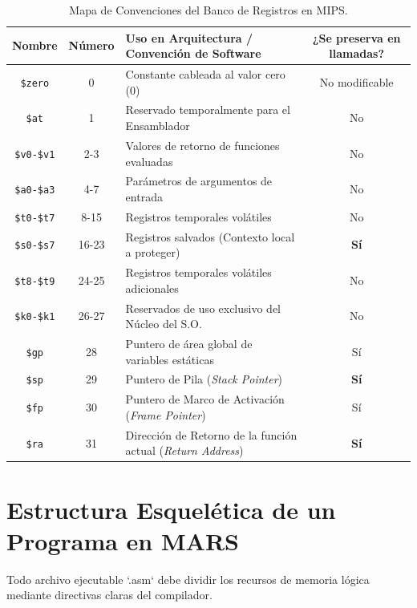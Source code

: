 \documentclass[11pt,letterpaper]{article}
\begin{document}
\begin{table}[h!]
\centering
\small
\begin{tabular}{cclc}
\toprule
\textbf{Nombre} & \textbf{Número} & \textbf{Uso en Arquitectura / Convención de Software} & \textbf{¿Se preserva en llamadas?} \\
\midrule
\texttt{\$zero} & 0 & Constante cableada al valor cero (0) & No modificable \\
\texttt{\$at}   & 1 & Reservado temporalmente para el Ensamblador & No \\
\texttt{\$v0-\$v1} & 2-3 & Valores de retorno de funciones evaluadas & No \\
\texttt{\$a0-\$a3} & 4-7 & Parámetros de argumentos de entrada & No \\
\texttt{\$t0-\$t7} & 8-15 & Registros temporales volátiles & No \\
\texttt{\$s0-\$s7} & 16-23 & Registros salvados (Contexto local a proteger) & \textbf{Sí} \\
\texttt{\$t8-\$t9} & 24-25 & Registros temporales volátiles adicionales & No \\
\texttt{\$k0-\$k1} & 26-27 & Reservados de uso exclusivo del Núcleo del S.O. & No \\
\texttt{\$gp}   & 28 & Puntero de área global de variables estáticas & Sí \\
\texttt{\$sp}   & 29 & Puntero de Pila (\textit{Stack Pointer}) & \textbf{Sí} \\
\texttt{\$fp}   & 30 & Puntero de Marco de Activación (\textit{Frame Pointer}) & Sí \\
\texttt{\$ra}   & 31 & Dirección de Retorno de la función actual (\textit{Return Address}) & \textbf{Sí} \\
\bottomrule
\end{tabular}
\caption{Mapa de Convenciones del Banco de Registros en MIPS.}
\end{table}

\section{Estructura Esquelética de un Programa en MARS}
Todo archivo ejecutable `.asm` debe dividir los recursos de memoria lógica mediante directivas claras del compilador.
\end{document}
